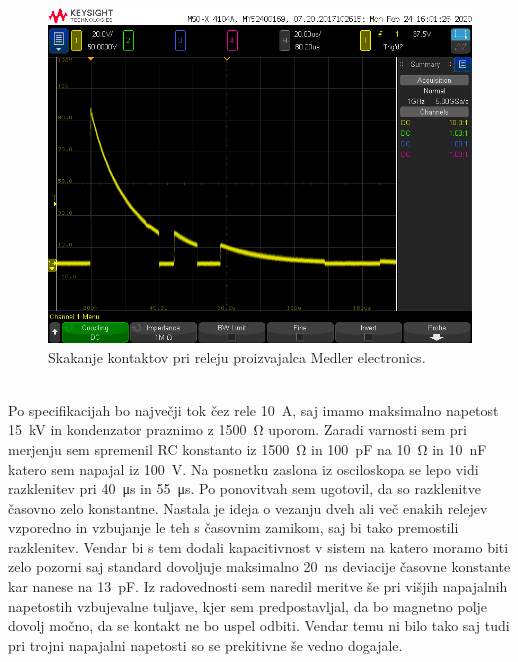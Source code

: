 \documentclass[a4paper,twoside,openright,12pt,slovene]{book}
\begin{document}
    \begin{figure}[H]
        \centering
        \includegraphics[width=1\columnwidth]{Slike/MedlerElectronicsRele.png}
        \caption{\label{BlokDiagramShema} Skakanje kontaktov pri releju proizvajalca Medler electronics.}
    \end{figure}
    ~\\Po specifikacijah bo največji tok čez rele \SI{10}{\ampere}, saj imamo maksimalno napetost \SI{15}{\kilo\volt} in kondenzator praznimo z \SI{1500}{\ohm} uporom. Zaradi varnosti sem pri merjenju sem spremenil RC konstanto iz \SI{1500}{\ohm} in \SI{100}{\pico\farad} na \SI{10}{\ohm} in \SI{10}{\nano\farad} katero sem napajal iz \SI{100}{\volt}. Na posnetku zaslona iz osciloskopa se lepo vidi razklenitev pri \SI{40}{\micro\second} in \SI{55}{\micro\second}. Po ponovitvah sem ugotovil, da so razklenitve časovno zelo konstantne. Nastala je ideja o vezanju dveh ali več enakih relejev vzporedno in vzbujanje le teh s časovnim zamikom, saj bi tako premostili razklenitev. Vendar bi s tem dodali kapacitivnost v sistem na katero moramo biti zelo pozorni saj standard dovoljuje maksimalno \SI{20}{\nano\second} deviacije časovne konstante kar nanese na \SI{13}{\pico\farad}.
    Iz radovednosti sem naredil meritve še pri višjih napajalnih napetostih vzbujevalne tuljave, kjer sem predpostavljal, da bo magnetno polje dovolj močno, da se kontakt ne bo uspel odbiti. Vendar temu ni bilo tako saj tudi pri trojni napajalni napetosti so se prekitivne še vedno dogajale. 
    
\end{document}
